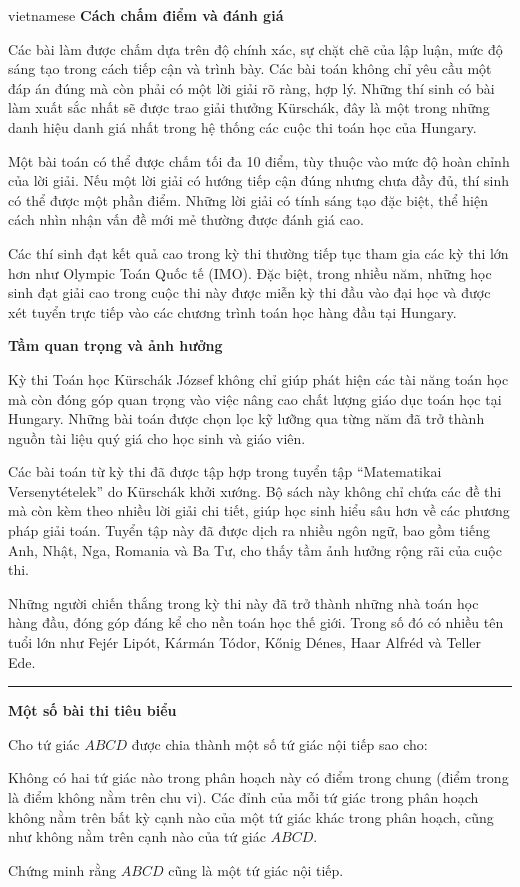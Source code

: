 \documentclass{article}
\begin{document}
\begin{otherlanguage*}{vietnamese}
\textbf{Cách chấm điểm và đánh giá}

Các bài làm được chấm dựa trên độ chính xác, sự chặt chẽ của lập luận, mức độ sáng tạo trong cách tiếp cận và trình bày.
Các bài toán không chỉ yêu cầu một đáp án đúng mà còn phải có một lời giải rõ ràng, hợp lý.
Những thí sinh có bài làm xuất sắc nhất sẽ được trao giải thưởng Kürschák, đây là một trong những danh hiệu danh giá nhất trong hệ thống các cuộc thi toán học của Hungary.

Một bài toán có thể được chấm tối đa 10 điểm, tùy thuộc vào mức độ hoàn chỉnh của lời giải.
Nếu một lời giải có hướng tiếp cận đúng nhưng chưa đầy đủ, thí sinh có thể được một phần điểm.
Những lời giải có tính sáng tạo đặc biệt, thể hiện cách nhìn nhận vấn đề mới mẻ thường được đánh giá cao.

Các thí sinh đạt kết quả cao trong kỳ thi thường tiếp tục tham gia các kỳ thi lớn hơn như Olympic Toán Quốc tế (IMO).
Đặc biệt, trong nhiều năm, những học sinh đạt giải cao trong cuộc thi này được miễn kỳ thi đầu vào đại học và được xét tuyển trực tiếp vào các chương trình toán học hàng đầu tại Hungary.

\textbf{Tầm quan trọng và ảnh hưởng}

Kỳ thi Toán học Kürschák József không chỉ giúp phát hiện các tài năng toán học mà còn đóng góp quan trọng vào việc nâng cao chất lượng giáo dục toán học tại Hungary.
Những bài toán được chọn lọc kỹ lưỡng qua từng năm đã trở thành nguồn tài liệu quý giá cho học sinh và giáo viên.

Các bài toán từ kỳ thi đã được tập hợp trong tuyển tập “Matematikai Versenytételek” do Kürschák khởi xướng.
Bộ sách này không chỉ chứa các đề thi mà còn kèm theo nhiều lời giải chi tiết, giúp học sinh hiểu sâu hơn về các phương pháp giải toán.
Tuyển tập này đã được dịch ra nhiều ngôn ngữ, bao gồm tiếng Anh, Nhật, Nga, Romania và Ba Tư, cho thấy tầm ảnh hưởng rộng rãi của cuộc thi.

Những người chiến thắng trong kỳ thi này đã trở thành những nhà toán học hàng đầu, đóng góp đáng kể cho nền toán học thế giới.
Trong số đó có nhiều tên tuổi lớn như Fejér Lipót, Kármán Tódor, Kőnig Dénes, Haar Alfréd và Teller Ede.

\bigbreak

\noindent\rule{16.5cm}{0.4pt}

\textbf{Một số bài thi tiêu biểu}

\bigbreak

\begin{problem*}
    Cho tứ giác \( ABCD \) được chia thành một số tứ giác nội tiếp sao cho:
    \begin{itemize}[topsep=0pt, partopsep=0pt, itemsep=0pt]
        \ii Không có hai tứ giác nào trong phân hoạch này có điểm trong chung (điểm trong là điểm không nằm trên chu vi).
        \ii Các đỉnh của mỗi tứ giác trong phân hoạch không nằm trên bất kỳ cạnh nào của một tứ giác khác trong phân hoạch, cũng như không nằm trên cạnh nào của tứ giác \( ABCD \).
    \end{itemize}
    Chứng minh rằng \( ABCD \) cũng là một tứ giác nội tiếp.
\end{problem*}


\end{otherlanguage*}
\end{document}
